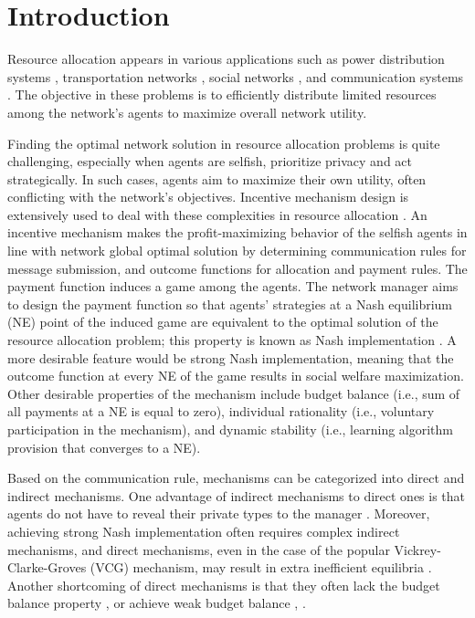 \documentclass[twocolumn]{autart}
\begin{document}
\section{Introduction}\label{sec1}
Resource allocation appears in various applications such as power distribution systems \cite{olivella2020centralised}, transportation networks \cite{bakhshayesh2021decentralized}, social networks \cite{dave2021social}, and communication systems \cite{xu2020client}. The objective in these problems is to efficiently distribute limited resources among the network's agents to maximize overall network utility.
\par
Finding the optimal network solution in resource allocation problems is quite challenging, especially when agents are selfish, prioritize privacy and act strategically. In such cases, agents aim to maximize their own utility, often conflicting with the network's objectives. Incentive mechanism design is extensively used to deal with these complexities in resource allocation \cite{chremos2024mechanism}. An incentive mechanism makes the profit-maximizing behavior of the selfish agents in line with network global optimal solution by determining communication rules for message submission, and outcome functions for allocation and payment rules. The payment function induces a game among the agents. The network manager aims to design the payment function so that agents' strategies at a Nash equilibrium (NE) point of the induced game are equivalent to the optimal solution of the resource allocation problem; this property is known as Nash implementation \cite{williams1986realization}. A more desirable feature would be strong Nash implementation, meaning that the outcome function at every NE of the game results in social welfare maximization. Other desirable properties of the mechanism include budget balance (i.e., sum of all payments at a NE is equal to zero), individual rationality (i.e., voluntary participation in the mechanism), and dynamic stability (i.e., learning algorithm provision that converges to a NE). 

Based on the communication rule, mechanisms can be categorized into direct and indirect mechanisms. One advantage of indirect mechanisms to direct ones is that agents do not have to reveal their private types to the manager \cite{narahari2014game}. Moreover, achieving strong Nash implementation often requires complex indirect mechanisms, and direct mechanisms, even in the case of the popular Vickrey-Clarke-Groves (VCG) mechanism, may result in extra inefficient equilibria \cite{rothkopf2007thirteen,JAIN20101276}.
Another shortcoming of direct mechanisms is that they often lack the budget balance property \cite{ZHONG2026112727}, \cite{satchidanandan2023incentive} or achieve weak budget balance \cite{ANGELI2023110870}, \cite{pu2020online}.
\end{document}
